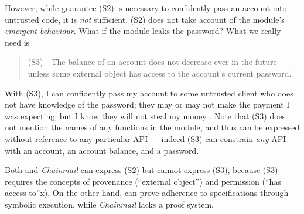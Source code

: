\vspace{.04in}

However, while guarantee (S2) is   necessary   to confidently pass 
 an account into untrusted code, it is \emph{not} sufficient.
 (S2) does not take  account of the module's \emph{emergent behaviour}.
 What if the module leaks the password?
 What we really need is
 \begin{quote}
(S3)\  \ The balance of an account does not decrease ever in the future unless some external 
object has access to the account's current password.
\end{quote}
With (S3), I can confidently pass my account to some untrusted client who
  does not have
 knowledge of the password; they may or may not make the payment I was expecting, but I
 know they will not steal my money \cite{ooToSecurity,miller-esop2013}.
 Note that (S3)  does not mention
 the names of any functions in the module, and 
 thus can be expressed without reference to any particular API ---
 indeed (S3) can constrain \emph{any} API with an account, an account
 balance, and a password.
 

  Both {} and  \emph{Chainmail} can express (S2) but
  {}  cannot express (S3), because 
(S3)  requires the concepts of provenance (``external object'') and
  permission (``has access to''x).
On the other hand, {} can prove adherence to  specifications through symbolic 
  execution, while  \emph{Chainmail}   lacks a proof system. 
  
\vspace{.04in}

